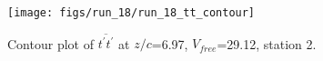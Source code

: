 \begin{figure}[H]
\centering
\texttt{[image: figs/run\_18/run\_18\_tt\_contour]}
\caption{Contour plot of $\overline{t^\prime t^\prime}$ at $z/c$=6.97, $V_{free}$=29.12, station 2.}
\label{fig:run_18_tt_contour}
\end{figure}


